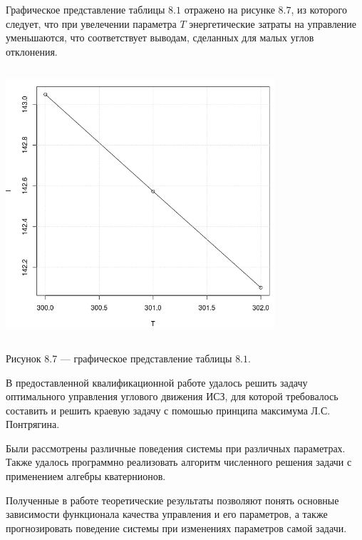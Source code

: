 \documentclass[14pt]{extreport}
\begin{document}
Графическое представление таблицы $8.1$ отражено на рисунке $8.7$, из которого следует, что при увелечении параметра $T$ энергетические затраты
на управление уменьшаются, что соответствует выводам, сделанных для малых углов отклонения.

\begin{center}
\includegraphics[width=10cm, height=10cm]{ba.png}

Рисунок 8.7 --- графическое представление таблицы $8.1$. 
\end{center}

\newpage

\conclusions

В предоставленной квалификационной работе удалось решить задачу оптимального управления углового движения ИСЗ, 
для которой требовалось составить и решить краевую задачу с помошью принципа максимума Л.С. Понтрягина. 

Были рассмотрены различные поведения системы при различных параметрах. Также удалось программно реализовать алгоритм численного решения задачи
с применением алгебры кватернионов.

Полученные в работе теоретические результаты позволяют понять основные зависимости функционала качества управления и его параметров,
а также прогнозировать поведение системы при изменениях параметров самой задачи.
\end{document}
